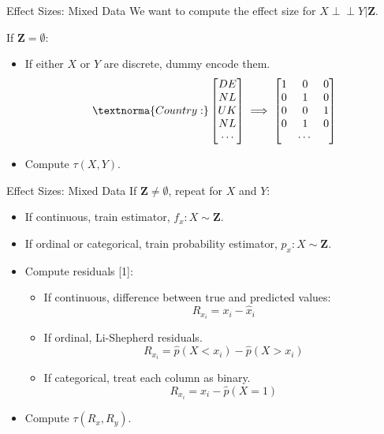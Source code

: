 \documentclass{beamer}
\def\ci{\perp\!\!\!\!\!\perp}
\begin{document}
\begin{frame}{Effect Sizes: Mixed Data}
	We want to compute the effect size for $ X \ci Y \rvert \bm{Z} $.
	
	\vspace{1em}

	If $ \bm{Z} = \emptyset $:
	\begin{itemize}
		\item If either $ X $ or $ Y $ are discrete, dummy encode them.
			$$ \textnorma{Country: } \begin{bmatrix} DE \\
					   NL \\
				           UK \\
				           NL \\
					   \cdots
					   \end{bmatrix} \implies \begin{bmatrix} 1 & 0 & 0 \\
				   						  0 & 1 & 0 \\
									          0 & 0 & 1 \\
									          0 & 1 & 0 \\
										    & \cdots &
									  \end{bmatrix}$$
		\item Compute $ \tau(X, Y) $.
	\end{itemize}
\end{frame}

\begin{frame}{Effect Sizes: Mixed Data}
	If $ \bm{Z} \ne \emptyset $, repeat for $ X $ and $ Y $:
	\begin{itemize}
		\item If continuous, train estimator, $ f_x: X \sim \bm{Z} $.
		\item If ordinal or categorical, train probability estimator, $ p_x: X \sim \bm{Z} $.
		\item Compute residuals [1]:
			\begin{itemize}
				\item If continuous, difference between true and predicted values:
					$$ R_{x_i} = x_i - \hat{x}_i $$
				\item If ordinal, Li-Shepherd residuals.
					$$ R_{x_i} = \hat{p}(X < x_i) - \hat{p}(X > x_i) $$
				\item If categorical, treat each column as binary.
					$$ R_{x_i} = x_i - \hat{p}(X=1) $$
			\end{itemize}
		\item Compute $ \tau(R_x, R_y) $.
	\end{itemize}

\end{frame}
\end{document}
